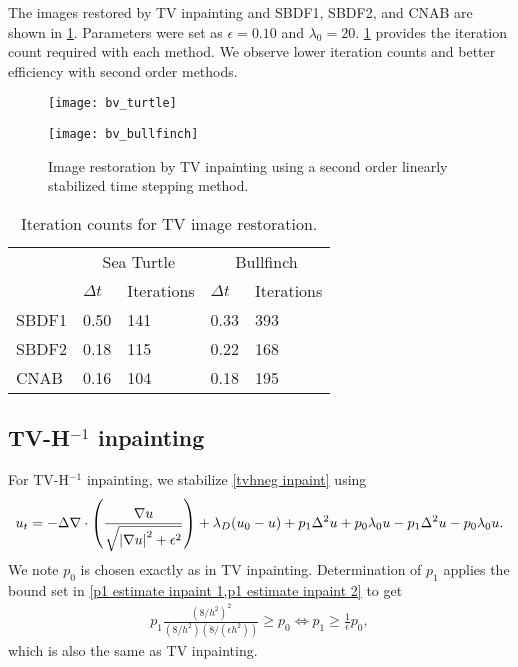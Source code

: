 The images restored by TV inpainting and SBDF1, SBDF2, and CNAB are shown in \cref{fig:bv inpainting}. Parameters were set as $\epsilon=0.10$ and $\lambda_0=20$. \cref{tab:bv iter counts} provides the iteration count required with each method. We observe lower iteration counts and better efficiency with second order methods.
\begin{figure}[htb!]
\centering
\begin{minipage}{0.65\textwidth}
	\texttt{[image: bv\_turtle]}
\end{minipage}
\begin{minipage}{0.65\textwidth}
	\texttt{[image: bv\_bullfinch]}
\end{minipage}
\caption[Image restoration by TV inpainting]{Image restoration by TV inpainting using a second order linearly stabilized time stepping method.}
\label{fig:bv inpainting}
\end{figure}


\begin{table}[htb!]
\caption[Iteration counts for TV image restoration]{Iteration counts for TV image restoration.}
        \centering\begin{tabular}{lll ll} \toprule[1.25pt]
& \multicolumn{2}{c}{Sea Turtle} & \multicolumn{2}{c}{Bullfinch}
\\
& $\Delta t$ & Iterations & $\Delta t$ & Iterations
\\ \midrule
SBDF1 & 0.50 & 141 & 0.33 & 393 
\\
SBDF2& 0.18 & 115 & 0.22 & 168
\\             
CNAB &  0.16 & 104 & 0.18 & 195
\\ \bottomrule[1.25pt]
\end{tabular}
\label{tab:bv iter counts}
\end{table}

\subsection{TV-H\texorpdfstring{$^{-1}$}{-1} inpainting}
For TV-H$^{-1}$ inpainting, we stabilize \cref{tvhneg inpaint} using
\begin{align}
        u_t = -\Delta \nabla \cdot \left(\frac{\nabla u}{\sqrt{\left|\nabla u\right|^2 + \epsilon^2}} \right) + \lambda_D(u_0 - u)  + p_1\Delta^2 u + p_0\lambda_0 u - p_1\Delta^2 u - p_0\lambda_0 u.
\label{tvhneg stabilized}
\end{align}
We note $p_0$ is chosen exactly as in TV inpainting. Determination of $p_1$ applies the bound set in \cref{p1 estimate inpaint 1,p1 estimate inpaint 2} to get 
\begin{align}
        p_1\frac{(8/h^2)^2}{(8/h^2)(8/(\epsilon h^2))} \geq p_0 
\iff p_1 \geq \frac{1}{\epsilon}p_0,
\end{align}
which is also the same as TV inpainting.

